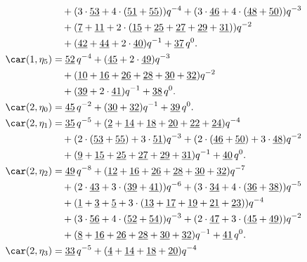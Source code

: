 \begin{align*}
	&\quad+(3\cdot\underline{53}+4\cdot(\underline{51}+\underline{55}))q^{-4}+(3\cdot\underline{46}+4\cdot(\underline{48}+\underline{50}))q^{-3}\\
	&\quad+(\underline{7}+\underline{11}+2\cdot(\underline{15}+\underline{25}+\underline{27}+\underline{29}+\underline{31}))q^{-2}\\
	&\quad+(\underline{42}+\underline{44}+2\cdot\underline{40})q^{-1}+\underline{37}\,q^0.\\
	\car(1,\eta_{5})
	&=\underline{52}\,q^{-4}+(\underline{45}+2\cdot\underline{49})q^{-3}\\
	&\quad+(\underline{10}+\underline{16}+\underline{26}+\underline{28}+\underline{30}+\underline{32})q^{-2}\\
	&\quad+(\underline{39}+2\cdot\underline{41})q^{-1}+\underline{38}\,q^0.\\
	\car(2,\eta_{0})
	&=\underline{45}\,q^{-2}+(\underline{30}+\underline{32})q^{-1}+\underline{39}\,q^0.\\
	\car(2,\eta_{1})
	&=\underline{35}\,q^{-5}+(\underline{2}+\underline{14}+\underline{18}+\underline{20}+\underline{22}+\underline{24})q^{-4}\\
	&\quad+(2\cdot(\underline{53}+\underline{55})+3\cdot\underline{51})q^{-3}+(2\cdot(\underline{46}+\underline{50})+3\cdot\underline{48})q^{-2}\\
	&\quad+(\underline{9}+\underline{15}+\underline{25}+\underline{27}+\underline{29}+\underline{31})q^{-1}+\underline{40}\,q^0.\\
	\car(2,\eta_{2})
	&=\underline{49}\,q^{-8}+(\underline{12}+\underline{16}+\underline{26}+\underline{28}+\underline{30}+\underline{32})q^{-7}\\
	&\quad+(2\cdot\underline{43}+3\cdot(\underline{39}+\underline{41}))q^{-6}+(3\cdot\underline{34}+4\cdot(\underline{36}+\underline{38}))q^{-5}\\
	&\quad+(\underline{1}+\underline{3}+\underline{5}+3\cdot(\underline{13}+\underline{17}+\underline{19}+\underline{21}+\underline{23}))q^{-4}\\
	&\quad+(3\cdot\underline{56}+4\cdot(\underline{52}+\underline{54}))q^{-3}+(2\cdot\underline{47}+3\cdot(\underline{45}+\underline{49}))q^{-2}\\
	&\quad+(\underline{8}+\underline{16}+\underline{26}+\underline{28}+\underline{30}+\underline{32})q^{-1}+\underline{41}\,q^0.\\
	\car(2,\eta_{3})
	&=\underline{33}\,q^{-5}+(\underline{4}+\underline{14}+\underline{18}+\underline{20})q^{-4}\\

\end{align*}
